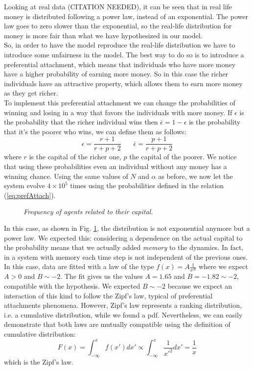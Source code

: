 Looking at real data (CITATION NEEDED), it can be seen that in real life money is distributed following a power law, instead of an exponential.
The power law goes to zero slower than the exponential, so the real-life distribution for money is more fair than what we have hypothesized in our model. \\
So, in order to have the model reproduce the real-life distribution we have to introduce some unfairness in the model.
The best way to do so is to introduce a preferential attachment, which means that individuals who have more money have a higher probability of earning more money.
So in this case the richer individuals have an attractive property, which allows them to earn more money as they get richer. \\
To implement this preferential attachment we can change the probabilities of winning and losing in a way that favors the individuals with more money.
If $\epsilon$ is the probability that the richer individual wins then $\bar{\epsilon} = 1 - \epsilon$ is the probability that it's the poorer who wins, we can define them as follows:
\begin{equation}
	\epsilon = \frac{r + 1}{r + p + 2} \ \ \ \ \ \ \ \  \bar{\epsilon} = \frac{p + 1}{r + p + 2}
	\label{eq:prefAttach}
\end{equation}
where $r$ is the capital of the richer one, $p$ the capital of the poorer.
We notice that using these probabilities even an individual without any money has a winning chance.
Using the same values of $N$ and $\alpha$ as before, we now let the system evolve $4 \times 10^5$ times using the probabilities defined in the relation (\ref*{eq:prefAttach}).
\begin{figure}[ht!]
    \centering
    \scalebox{.7}{}
    \caption{\emph{Frequency of agents related to their capital.}}
    \label{fig:prefAttach}
\end{figure}
In this case, as shown in Fig. \ref{fig:prefAttach}, the distribution is not exponential anymore but a power law.
We expected this: considering a dependence on the actual capital to the probability means that we actually added \emph{memory} to the dynamics.
In fact, in a system with memory each time step is not independent of the previous ones.
In this case, data are fitted with a law of the type $f(x) = A\frac{1}{x^B}$ where we expect $A > 0$ and $B \sim -2$.
The fit gives us the values $A = 1.65$ and $B = -1.82 \sim -2$, compatible with the hypothesis.
We expected $B \sim -2$ because we expect an interaction of this kind to follow the Zipf's law, typical of preferential attachments phenomena.
However, Zipf's law represents a ranking distribution, i.e. a cumulative distribution, while we found a pdf.
Nevertheless, we can easily demonstrate that both laws are mutually compatible using the definition of cumulative distribution:
\begin{equation*}
	F(x) = \int_{-\infty}^x f(x') dx' \propto \int_{-\infty}^x \frac{1}{{x'}^2} dx' = \frac{1}{x}
\end{equation*}
which is the Zipf's law.
